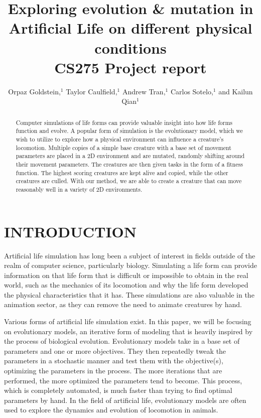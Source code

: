 \documentclass[letterpaper, 10 pt, conference]{ieeeconf}  %
\title{\LARGE \bf
Exploring evolution \& mutation in Artificial Life on different physical conditions \\
CS275 Project report
}
\author{Orpaz Goldstein,$^{1}$ Taylor Caulfield,$^{1}$ Andrew Tran,$^{1}$ Carlos Sotelo,$^{1}$ and Kailun Qian$^{1}$%
}
\begin{document}
\maketitle
\thispagestyle{empty}
\pagestyle{empty}


\begin{abstract}

Computer simulations of life forms can provide valuable insight into how life forms function and evolve. A popular form of simulation is the evolutionary model, which we wish to utilize to explore how a physical environment can influence a creature's locomotion. Multiple copies of a simple base creature with a base set of movement parameters are placed in a 2D environment and are mutated, randomly shifting around their movement parameters. The creatures are then given tasks in the form of a fitness function. The highest scoring creatures are kept alive and copied, while the other creatures are culled. With our method, we are able to create a creature that can move reasonably well in a variety of 2D environments.

\end{abstract}


\section{INTRODUCTION}

Artificial life simulation has long been a subject of interest in fields outside of the realm of computer science, particularly biology. Simulating a life form can provide information on that life form that is difficult or impossible to obtain in the real world, such as the mechanics of its locomotion and why the life form developed the physical characteristics that it has. These simulations are also valuable in the animation sector, as they can remove the need to animate creatures by hand.

Various forms of artificial life simulation exist. In this paper, we will be focusing on evolutionary models, an iterative form of modeling that is heavily inspired by the process of biological evolution. Evolutionary models take in a base set of parameters and one or more objectives. They then repeatedly tweak the parameters in a stochastic manner and test them with the objective(s), optimizing the parameters in the process. The more iterations that are performed, the more optimized the parameters tend to become. This process, which is completely automated, is much faster than trying to find optimal parameters by hand. In the field of artificial life, evolutionary models are often used to explore the dynamics and evolution of locomotion in animals.
\end{document}
